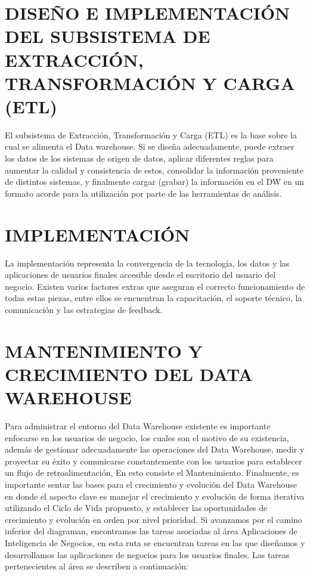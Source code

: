 \section{DISEÑO E IMPLEMENTACIÓN DEL SUBSISTEMA DE EXTRACCIÓN, TRANSFORMACIÓN Y CARGA (ETL)}
\item{El subsistema de Extracción, Transformación y Carga (ETL) es la base sobre la cual se alimenta el Data warehouse. Si se diseña adecuadamente, puede extraer los datos de los sistemas de origen de datos, aplicar diferentes reglas para aumentar la calidad y consistencia de estos, consolidar la información proveniente de distintos sistemas, y finalmente cargar (grabar) la información en el DW en un formato acorde para la utilización por parte de las herramientas de análisis.}



\section{IMPLEMENTACIÓN}
\item{La implementación representa la convergencia de la tecnología, los datos y las aplicaciones de usuarios finales accesible desde el escritorio del usuario del negocio. Existen varios factores extras que aseguran el correcto funcionamiento de todas estas piezas, entre ellos se encuentran la capacitación, el soporte técnico, la comunicación y las estrategias de feedback.}



\section{MANTENIMIENTO Y CRECIMIENTO DEL DATA WAREHOUSE}
\item{
Para administrar el entorno del Data Warehouse existente es importante enfocarse en los usuarios de negocio, los cuales son el motivo de su existencia, además de gestionar adecuadamente las operaciones del Data Warehouse, medir y proyectar su éxito y comunicarse constantemente con los usuarios para establecer un flujo de retroalimentación, En esto consiste el Mantenimiento. Finalmente, es importante sentar las bases para el crecimiento y evolución del Data Warehouse en donde el aspecto clave es manejar el crecimiento y evolución de forma iterativa utilizando el Ciclo de Vida propuesto, y establecer las oportunidades de crecimiento y evolución en orden por nivel prioridad.
Si avanzamos por el camino inferior del diagraman, encontramos las tareas asociadas al área Aplicaciones de Inteligencia de Negocios, en esta ruta se encuentran tareas en las que diseñamos y desarrollamos las aplicaciones de negocios para los usuarios finales. Las tareas pertenecientes al área se describen a continuación:

}

